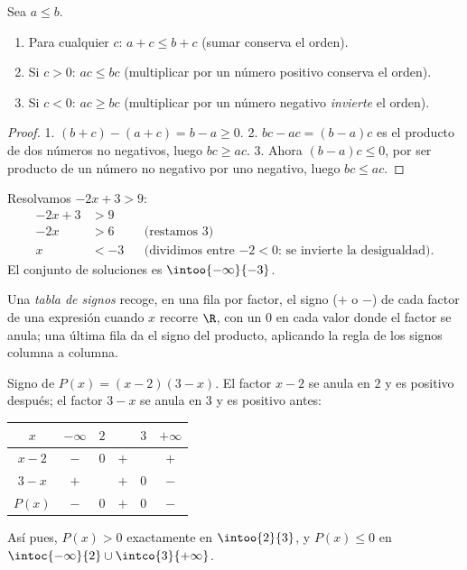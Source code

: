 \begin{proposition}\label{prop:g10:algebra:ineqrules}
Sea $a \leq b$.
\begin{enumerate}
  \item Para cualquier $c$: $a + c \leq b + c$ (sumar conserva el orden).
  \item Si $c > 0$: $ac \leq bc$ (multiplicar por un número positivo
        conserva el orden).
  \item Si $c < 0$: $ac \geq bc$ (multiplicar por un número negativo
        \emph{invierte} el orden).
\end{enumerate}
\end{proposition}

\begin{proof}
1. $(b + c) - (a + c) = b - a \geq 0$.
2. $bc - ac = (b-a)c$ es el producto de dos números no negativos, luego
$bc \geq ac$.
3. Ahora $(b-a)c \leq 0$, por ser producto de un número no negativo por
uno negativo, luego $bc \leq ac$.
\end{proof}

\begin{example}\label{ex:g10:algebra:firstineq}
Resolvamos $-2x + 3 > 9$:
\begin{align*}
-2x + 3 &> 9 \\
-2x &> 6 && \text{(restamos 3)} \\
x &< -3 && \text{(dividimos entre $-2 < 0$: se invierte la desigualdad).}
\end{align*}
El conjunto de soluciones es $\intoo{-\infty}{-3}$.
\end{example}

\begin{definition}\label{def:g10:algebra:signtable}
Una \emph{tabla de signos} recoge, en una fila por
factor, el signo ($+$ o $-$) de cada factor de una expresión cuando $x$
recorre $\R$, con un $0$ en cada valor donde el factor se anula; una
última fila da el signo del producto, aplicando la regla de los signos
columna a columna.
\end{definition}

\begin{example}\label{ex:g10:algebra:signtable}
Signo de $P(x) = (x - 2)(3 - x)$. El factor $x - 2$ se anula en $2$ y es
positivo después; el factor $3 - x$ se anula en $3$ y es positivo antes:
\begin{center}
\renewcommand{\arraystretch}{1.3}
\begin{tabular}{c|ccccc}
$x$ & $-\infty$ \quad & $2$ & & $3$ & \quad $+\infty$ \\
\hline
$x - 2$ & $-$ & $0$ & $+$ & & $+$ \\
$3 - x$ & $+$ & & $+$ & $0$ & $-$ \\
\hline
$P(x)$ & $-$ & $0$ & $+$ & $0$ & $-$ \\
\end{tabular}
\end{center}
Así pues, $P(x) > 0$ exactamente en $\intoo{2}{3}$, y $P(x) \leq 0$ en
$\intoc{-\infty}{2} \cup \intco{3}{+\infty}$.
\end{example}

